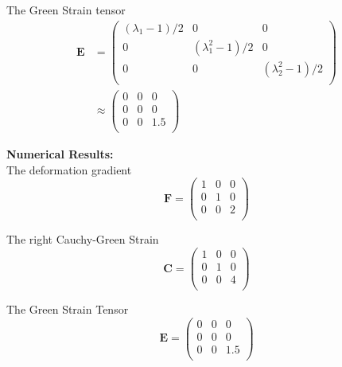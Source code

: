 \documentclass[../main.tex]{subfiles}
\begin{document}
\begin{minipage}[t]{0.5\textwidth}
          The Green Strain tensor
          \begin{align*}
            \mathbf{E} &=
                         \begin{pmatrix}
                           (\lambda_1-1)/2 & 0 & 0\\
                           0 & (\lambda_1^2-1)/2 & 0\\
                           0 & 0 & (\lambda_2^2-1)/2\\
                         \end{pmatrix}\\ &\approx
                                           \begin{pmatrix}
                                             0 & 0 & 0\\
                                             0 & 0 & 0\\
                                             0 & 0 & 1.5\\
                                           \end{pmatrix}
          \end{align*}
	\end{minipage}
	\begin{minipage}[t]{0.5\textwidth}
          \textbf{Numerical Results:}\\
	
          The deformation gradient
          \[
          \mathbf{F}=
          \begin{pmatrix}
            1 & 0 & 0\\
            0 & 1 & 0\\
            0 & 0 & 2\\
          \end{pmatrix}
          \]
          \vspace{13mm}
	
          The right Cauchy-Green Strain
          \[
          \mathbf{C}=
          \begin{pmatrix}
            1 & 0 & 0\\
            0 & 1 & 0\\
            0 & 0 & 4\\
          \end{pmatrix}
          \]\vspace{13mm}
	
          The Green Strain Tensor
          \[
          \mathbf{E}=
          \begin{pmatrix}
            0 & 0 & 0\\
            0 & 0 & 0\\
            0 & 0 & 1.5\\
          \end{pmatrix}
          \]
	\end{minipage}
\end{document}
